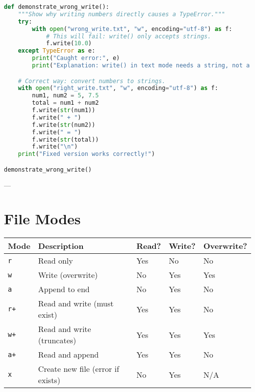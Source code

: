 \begin{lstlisting}[language=Python, caption={Example: Handling write errors gracefully.}]
def demonstrate_wrong_write():
    """Show why writing numbers directly causes a TypeError."""
    try:
        with open("wrong_write.txt", "w", encoding="utf-8") as f:
            # This will fail: write() only accepts strings.
            f.write(10.0)
    except TypeError as e:
        print("Caught error:", e)
        print("Explanation: write() in text mode needs a string, not a number.")

    # Correct way: convert numbers to strings.
    with open("right_write.txt", "w", encoding="utf-8") as f:
        num1, num2 = 5, 7.5
        total = num1 + num2
        f.write(str(num1))
        f.write(" + ")
        f.write(str(num2))
        f.write(" = ")
        f.write(str(total))
        f.write("\n")
    print("Fixed version works correctly!")

demonstrate_wrong_write()
\end{lstlisting}

---

\section{File Modes}

\begin{center}
\begin{tabular}{l l l l l}
\textbf{Mode} & \textbf{Description} & \textbf{Read?} & \textbf{Write?} & \textbf{Overwrite?} \\
\hline
\texttt{r} & Read only & Yes & No & No \\
\texttt{w} & Write (overwrite) & No & Yes & Yes \\
\texttt{a} & Append to end & No & Yes & No \\
\texttt{r+} & Read and write (must exist) & Yes & Yes & No \\
\texttt{w+} & Read and write (truncates) & Yes & Yes & Yes \\
\texttt{a+} & Read and append & Yes & Yes & No \\
\texttt{x} & Create new file (error if exists) & No & Yes & N/A \\
\end{tabular}
\end{center}

